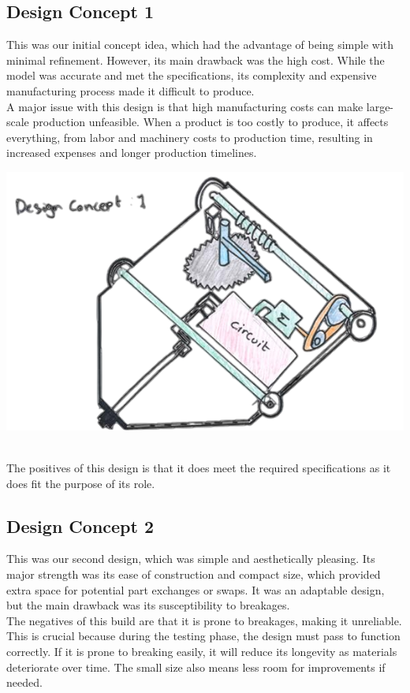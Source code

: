 \documentclass{article}
\begin{document}
\begin{minipage}{0.59\textwidth}
\subsection{Design Concept 1}
This was our initial concept idea, which had the advantage of being simple with minimal refinement. However, its main drawback was the high cost. While the model was accurate and met the specifications, its complexity and expensive manufacturing process made it difficult to produce.\\[8pt]
A major issue with this design is that high manufacturing costs can make large-scale production unfeasible. When a product is too costly to produce, it affects everything, from labor and machinery costs to production time, resulting in increased expenses and longer production timelines.
\end{minipage}\hfill
\begin{minipage}{0.4\textwidth}
\centering
\includegraphics[width=1\textwidth]{images/image_6_2-Photoroom.png}
\end{minipage}\\[8pt]
The positives of this design is that it does meet the required specifications as it does fit the purpose of its role.\\[1em]
\begin{minipage}{0.59\textwidth}
	\subsection{Design Concept 2}
	This was our second design, which was simple and aesthetically pleasing. Its major strength was its ease of construction and compact size, which provided extra space for potential part exchanges or swaps. It was an adaptable design, but the main drawback was its susceptibility to breakages.\\[8pt]
	The negatives of this build are that it is prone to breakages, making it unreliable. This is crucial because during the testing phase, the design must pass to function correctly. If it is prone to breaking easily, it will reduce its longevity as materials deteriorate over time. The small size also means less room for improvements if needed.
\end{minipage}\hfill
\end{document}
